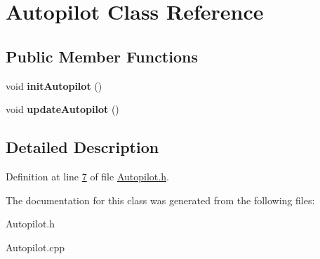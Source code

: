 \hypertarget{class_autopilot}{}\section{Autopilot Class Reference}
\label{class_autopilot}
\subsection*{Public Member Functions}
\begin{DoxyCompactItemize}
\item 
\mbox{\label{class_autopilot_aea3535a0804c6ae837c737298eaed687}} 
void {\bfseries init\+Autopilot} ()
\item 
\mbox{\label{class_autopilot_ad451062762f390252387e3bfad802273}} 
void {\bfseries update\+Autopilot} ()
\end{DoxyCompactItemize}


\subsection{Detailed Description}


Definition at line \hyperlink{_autopilot_8h_source_l00007}{7} of file \hyperlink{_autopilot_8h_source}{Autopilot.\+h}.



The documentation for this class was generated from the following files\+:\begin{DoxyCompactItemize}
\item 
Autopilot.\+h\item 
Autopilot.\+cpp\end{DoxyCompactItemize}
